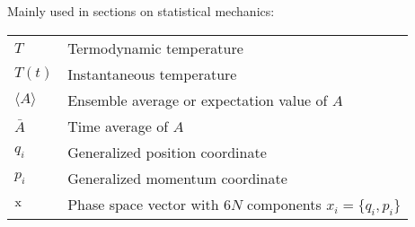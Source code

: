 \documentclass[11pt,bibliography=totoc,index=totoc]{scrbook}   %
\begin{document}
  Mainly used in sections on statistical mechanics:
  
  \begin{tabular}{ll}
    $T$     & Termodynamic temperature \\
    $T(t)$  & Instantaneous temperature \\
    $\langle A \rangle$ & Ensemble average or expectation value of $A$\\
    $\bar{A}$ & Time average of $A$ \\
    $q_i$   & Generalized position coordinate \\
    $p_i$   & Generalized momentum coordinate \\
    $\mathrm{x}$ & Phase space vector with $6N$ components $x_i=\{q_i,p_i\}$
  \end{tabular}
  
\layout

\printindex
\end{document}

